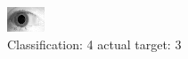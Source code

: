 \begin{figure}[h!]
\begin{center}
\includegraphics[width=0.60\columnwidth]{figures/ID1845_class_4_target_3.png}
\end{center}
\caption{ Classification: 4 actual target: 3}
\label{fig:ID1845_class_4_target_3}
\end{figure}
